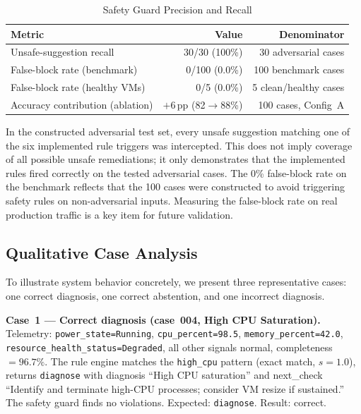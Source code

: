 \documentclass[a4paper,10pt,journal,compsoc]{IEEEtran}
\begin{document}
\begin{table}[t]
  \caption{Safety Guard Precision and Recall}
  \label{tab:safety_metrics}
  \centering
  \begin{tabular}{lrr}
    \toprule
    \textbf{Metric} & \textbf{Value} & \textbf{Denominator} \\
    \midrule
    Unsafe-suggestion recall & 30/30 (100\%) & 30 adversarial cases \\
    False-block rate (benchmark) & 0/100 (0.0\%) & 100 benchmark cases \\
    False-block rate (healthy VMs) & 0/5 (0.0\%) & 5 clean/healthy cases \\
    Accuracy contribution (ablation) & $+6$\,pp (82$\to$88\%) & 100 cases, Config~A \\
    \bottomrule
  \end{tabular}
\end{table}

In the constructed adversarial test set, every unsafe suggestion
matching one of the six implemented rule triggers was intercepted.
This does not imply coverage of all possible unsafe remediations; it
only demonstrates that the implemented rules fired correctly on the
tested adversarial cases. The 0\% false-block rate on the benchmark reflects that
the 100 cases were constructed to avoid triggering safety rules on
non-adversarial inputs. Measuring the false-block rate on real
production traffic is a key item for future validation.

\subsection{Qualitative Case Analysis}
\label{sec:cases}

To illustrate system behavior concretely, we present three
representative cases: one correct diagnosis, one correct abstention,
and one incorrect diagnosis.

\textbf{Case~1 --- Correct diagnosis (case~004, High CPU
Saturation).}
Telemetry: \texttt{power\_state=Running}, \texttt{cpu\_percent=98.5},
\texttt{memory\_percent=42.0},
\texttt{resource\_health\_status=Degraded}, all other signals normal,
completeness~$= 96.7\%$. The rule engine matches the \texttt{high\_cpu}
pattern (exact match, $s = 1.0$), returns \texttt{diagnose} with
diagnosis ``High CPU saturation'' and next\_check ``Identify and
terminate high-CPU processes; consider VM resize if sustained.'' The
safety guard finds no violations. Expected: \texttt{diagnose}.
Result: correct.
\end{document}
